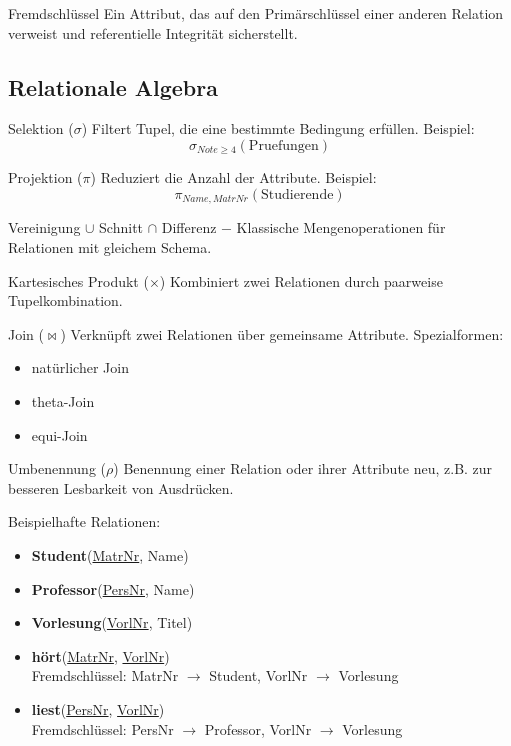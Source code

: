 \documentclass{article}
\begin{document}
\begin{block}{Fremdschlüssel}
Ein Attribut, das auf den Primärschlüssel einer anderen Relation verweist und referentielle Integrität sicherstellt.
\end{block}

\subsection*{Relationale Algebra}

\begin{block}{Selektion ($\sigma$)}
Filtert Tupel, die eine bestimmte Bedingung erfüllen. Beispiel:
\[
\sigma_{Note \geq 4}(\text{Pruefungen})
\]
\end{block}

\begin{block}{Projektion ($\pi$)}
Reduziert die Anzahl der Attribute. Beispiel:
\[
\pi_{Name, MatrNr}(\text{Studierende})
\]
\end{block}

\begin{block}{Vereinigung $\cup$ Schnitt $\cap$ Differenz $-$}
Klassische Mengenoperationen für Relationen mit gleichem Schema.
\end{block}

\begin{block}{Kartesisches Produkt ($\times$)}
Kombiniert zwei Relationen durch paarweise Tupelkombination.
\end{block}

\begin{block}{Join ($\bowtie$)}
Verknüpft zwei Relationen über gemeinsame Attribute. Spezialformen:
\begin{itemize}
  \item natürlicher Join
  \item theta-Join
  \item equi-Join
\end{itemize}
\end{block}

\begin{block}{Umbenennung ($\rho$)}
Benennung einer Relation oder ihrer Attribute neu, z.B. zur besseren Lesbarkeit von Ausdrücken.
\end{block}


Beispielhafte Relationen:
\begin{itemize}
  \item \textbf{Student}(\underline{MatrNr}, Name)
  \item \textbf{Professor}(\underline{PersNr}, Name)
  \item \textbf{Vorlesung}(\underline{VorlNr}, Titel)
  \item \textbf{hört}(\underline{MatrNr}, \underline{VorlNr}) \\
        Fremdschlüssel: MatrNr $\rightarrow$ Student, VorlNr $\rightarrow$ Vorlesung
  \item \textbf{liest}(\underline{PersNr}, \underline{VorlNr}) \\
        Fremdschlüssel: PersNr $\rightarrow$ Professor, VorlNr $\rightarrow$ Vorlesung
\end{itemize}
\end{document}
